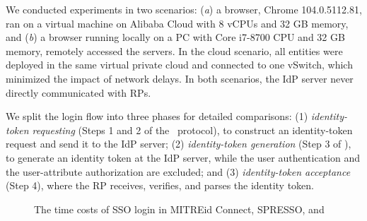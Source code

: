 We conducted experiments in two scenarios: (\emph{a}) a browser, Chrome 104.0.5112.81, ran on a virtual machine on Alibaba Cloud with 8 vCPUs and 32 GB memory, and (\emph{b}) a browser running locally on a PC with Core i7-8700 CPU and 32 GB memory, remotely accessed the servers.
In the cloud scenario, all entities were deployed in the same virtual private cloud and connected to one vSwitch, which minimized the impact of network delays.
In both scenarios, the IdP server never directly communicated with RPs.

 We split the login flow into three phases for detailed comparisons: (1)
{\em identity-token requesting} (Steps 1 and 2 of the \usso\ protocol), to construct an identity-token request and send it to the IdP server; (2) {\em identity-token generation} (Step 3 of \usso), to generate an identity token at the IdP server, while the user authentication and the user-attribute authorization are excluded; and (3) {\em identity-token acceptance} (Step 4), where the RP receives, verifies, and parses the identity token.

\begin{figure}[tb]
  \centering
  \caption{The time costs of SSO login in MITREid Connect, SPRESSO, and \usso}
  \label{fig:evaluation}
\end{figure}


